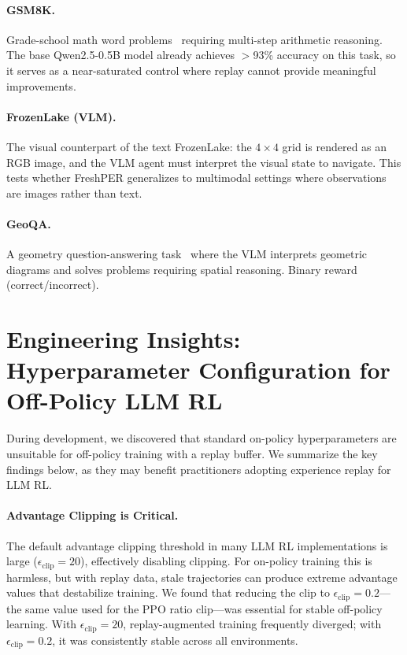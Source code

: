 \documentclass[runningheads]{llncs}
\newcommand{\method}{FreshPER}
\begin{document}
\paragraph{GSM8K.}
Grade-school math word problems~\cite{cobbe2021gsm8k} requiring multi-step arithmetic reasoning. The base Qwen2.5-0.5B model already achieves ${>}$93\% accuracy on this task, so it serves as a near-saturated control where replay cannot provide meaningful improvements.

\paragraph{FrozenLake (VLM).}
The visual counterpart of the text FrozenLake: the $4{\times}4$ grid is rendered as an RGB image, and the VLM agent must interpret the visual state to navigate. This tests whether \method{} generalizes to multimodal settings where observations are images rather than text.

\paragraph{GeoQA.}
A geometry question-answering task~\cite{chen2021geoqa} where the VLM interprets geometric diagrams and solves problems requiring spatial reasoning. Binary reward (correct/incorrect).


\section{Engineering Insights: Hyperparameter Configuration for Off-Policy LLM RL}
\label{app:config_a}

During development, we discovered that standard on-policy hyperparameters are unsuitable for off-policy training with a replay buffer. We summarize the key findings below, as they may benefit practitioners adopting experience replay for LLM RL.

\paragraph{Advantage Clipping is Critical.}
The default advantage clipping threshold in many LLM RL implementations is large ($\epsilon_{\text{clip}} = 20$), effectively disabling clipping. For on-policy training this is harmless, but with replay data, stale trajectories can produce extreme advantage values that destabilize training. We found that reducing the clip to $\epsilon_{\text{clip}} = 0.2$---the same value used for the PPO ratio clip---was essential for stable off-policy learning. With $\epsilon_{\text{clip}} = 20$, replay-augmented training frequently diverged; with $\epsilon_{\text{clip}} = 0.2$, it was consistently stable across all environments.
\end{document}
